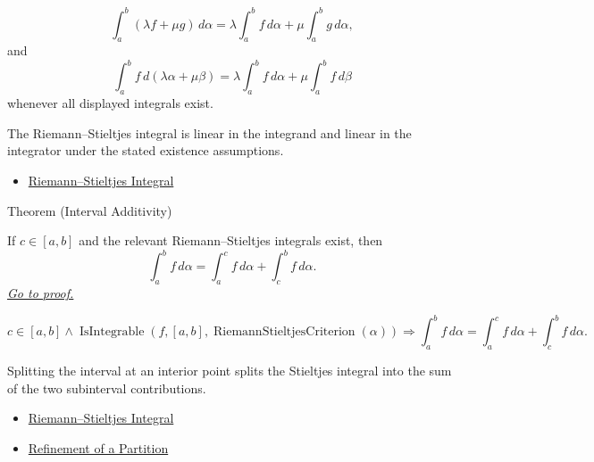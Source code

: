 \begin{remark*}
\[
\int_a^b (\lambda f+\mu g)\,d\alpha
=
\lambda\int_a^b f\,d\alpha+\mu\int_a^b g\,d\alpha,
\]
and
\[
\int_a^b f\,d(\lambda\alpha+\mu\beta)
=
\lambda\int_a^b f\,d\alpha+\mu\int_a^b f\,d\beta
\]
whenever all displayed integrals exist.
\end{remark*}

\begin{remark*}[Interpretation]
The Riemann--Stieltjes integral is linear in the integrand and linear in the
integrator under the stated existence assumptions.
\end{remark*}

\begin{dependencies}
\begin{itemize}
  \item \hyperref[def:riemann-stieltjes-integral]{Riemann--Stieltjes Integral}
\end{itemize}
\end{dependencies}

\begin{theorembox}{Theorem (Interval Additivity)}
\begin{theorem}
\label{thm:rs-interval-additivity}
If \(c\in[a,b]\) and the relevant Riemann--Stieltjes integrals exist, then
\[
  \int_a^b f\,d\alpha
  =
  \int_a^c f\,d\alpha+\int_c^b f\,d\alpha .
\]
\hyperref[prf:rs-interval-additivity]{\textit{Go to proof.}}
\end{theorem}
\end{theorembox}

\begin{remark*}
\[
c\in[a,b]\land
\operatorname{IsIntegrable}(f,[a,b],\operatorname{RiemannStieltjesCriterion}(\alpha))
\Longrightarrow
\int_a^b f\,d\alpha
=
\int_a^c f\,d\alpha+\int_c^b f\,d\alpha.
\]
\end{remark*}

\begin{remark*}[Interpretation]
Splitting the interval at an interior point splits the Stieltjes integral into
the sum of the two subinterval contributions.
\end{remark*}

\begin{dependencies}
\begin{itemize}
  \item \hyperref[def:riemann-stieltjes-integral]{Riemann--Stieltjes Integral}
  \item \hyperref[def:partition-refinement]{Refinement of a Partition}
\end{itemize}
\end{dependencies}


